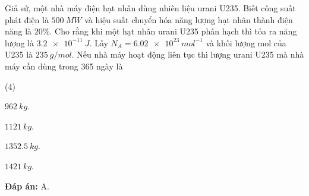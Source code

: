 {	Giả sử, một nhà máy điện hạt nhân dùng nhiên liệu urani U235. Biết công suất phát điện là $ \SI{500}{MW} $ và hiệu suất chuyển hóa năng lượng hạt nhân thành điện năng là $ 20 \% $. Cho rằng khi một hạt nhân urani U235 phân hạch thì tỏa ra năng lượng là $ \SI{3,2 e-11}{J} $. Lấy $ N_{A} = \SI{6,02 e23}{mol^{-1}} $ và khối lượng mol của U235 là $ \SI{235}{g/mol} $. Nếu nhà máy hoạt động liên tục thì lượng urani U235 mà nhà máy cần dùng trong 365 ngày là
	\begin{mcq}(4)
		\item $ \SI{962}{kg} $.
		\item $ \SI{1121}{kg} $.
		\item $ \SI{1352,5}{kg} $.
		\item $ \SI{1421}{kg} $.
	\end{mcq}	
	
	\textbf{Đáp án:} A.
}




